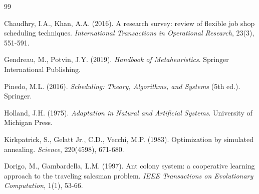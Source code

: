 \documentclass[11pt,twocolumn]{article}
\begin{document}
\begin{thebibliography}{99}

Chaudhry, I.A., Khan, A.A. (2016). A research survey: review of flexible job shop scheduling techniques. \textit{International Transactions in Operational Research}, 23(3), 551-591.

Gendreau, M., Potvin, J.Y. (2019). \textit{Handbook of Metaheuristics}. Springer International Publishing.

Pinedo, M.L. (2016). \textit{Scheduling: Theory, Algorithms, and Systems} (5th ed.). Springer.

Holland, J.H. (1975). \textit{Adaptation in Natural and Artificial Systems}. University of Michigan Press.

Kirkpatrick, S., Gelatt Jr., C.D., Vecchi, M.P. (1983). Optimization by simulated annealing. \textit{Science}, 220(4598), 671-680.

Dorigo, M., Gambardella, L.M. (1997). Ant colony system: a cooperative learning approach to the traveling salesman problem. \textit{IEEE Transactions on Evolutionary Computation}, 1(1), 53-66.

\end{thebibliography}
\end{document}

